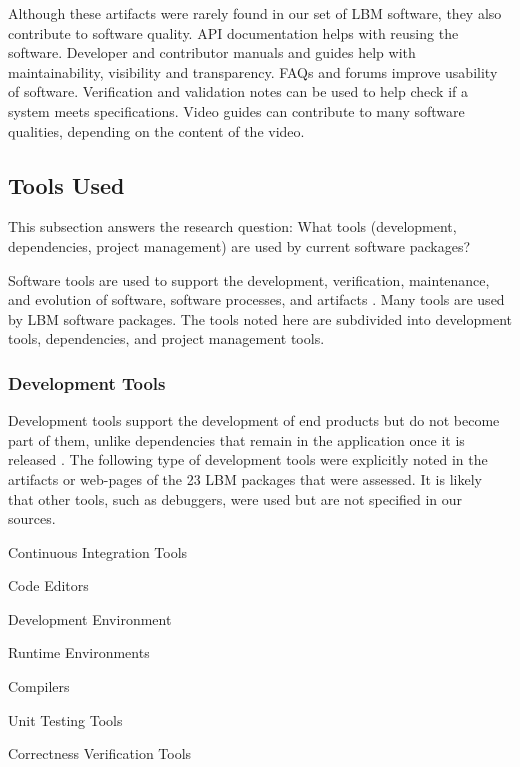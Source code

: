 \documentclass[12pt, notitlepage]{article}
\begin{document}
Although these artifacts were rarely found in our set of LBM software, they also contribute to software quality. API documentation helps with reusing the software. Developer and contributor manuals and guides help with maintainability, visibility and transparency. FAQs and forums improve usability of software. Verification and validation notes can be used to help check if a system meets specifications. Video guides can contribute to many software qualities, depending on the content of the video. 

\subsection{Tools Used}\label{tools}

This subsection answers the research question: What tools (development, dependencies, project management) are used by current software packages?

Software tools are used to support the development, verification, maintenance, and evolution of software, software processes, and artifacts \citep{ghezzi1991fundamentals}. Many tools are used by LBM software packages. The tools noted here are subdivided into development tools, dependencies, and project management tools.

\subsubsection{Development Tools}

Development tools support the development of end products but do not become part of them, unlike dependencies that remain in the application once it is released \citep{ghezzi1991fundamentals}. The following type of development tools were explicitly noted in the artifacts or web-pages of the 23 LBM packages that were assessed. It is likely that other tools, such as debuggers, were used but are not specified in our sources.

	\begin{multicols}{2}	
		\begin{itemize}
		\end{itemize}
	\end{multicols}
\end{document}
